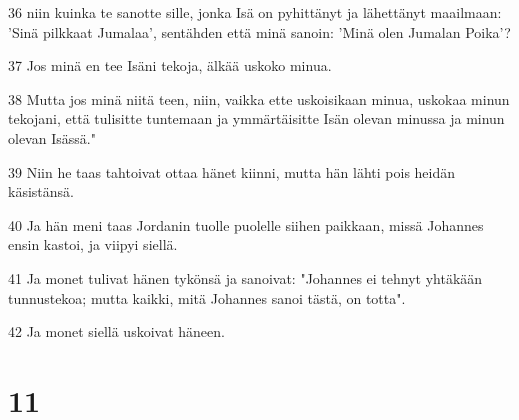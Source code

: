 \par 36 niin kuinka te sanotte sille, jonka Isä on pyhittänyt ja lähettänyt maailmaan: 'Sinä pilkkaat Jumalaa', sentähden että minä sanoin: 'Minä olen Jumalan Poika'?
\par 37 Jos minä en tee Isäni tekoja, älkää uskoko minua.
\par 38 Mutta jos minä niitä teen, niin, vaikka ette uskoisikaan minua, uskokaa minun tekojani, että tulisitte tuntemaan ja ymmärtäisitte Isän olevan minussa ja minun olevan Isässä."
\par 39 Niin he taas tahtoivat ottaa hänet kiinni, mutta hän lähti pois heidän käsistänsä.
\par 40 Ja hän meni taas Jordanin tuolle puolelle siihen paikkaan, missä Johannes ensin kastoi, ja viipyi siellä.
\par 41 Ja monet tulivat hänen tykönsä ja sanoivat: "Johannes ei tehnyt yhtäkään tunnustekoa; mutta kaikki, mitä Johannes sanoi tästä, on totta".
\par 42 Ja monet siellä uskoivat häneen.

\chapter{11}

